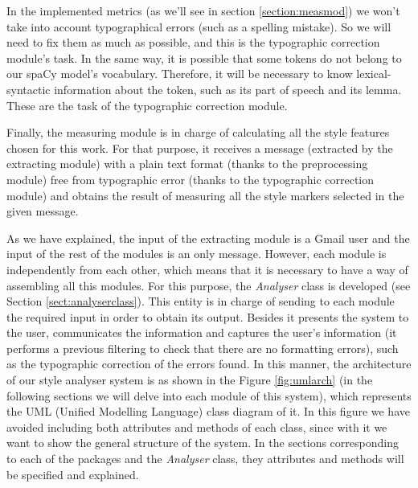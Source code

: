 In the implemented metrics (as we'll see in section \ref{section:measmod}) we won't take into account typographical errors (such as a spelling mistake). So we will need to fix them as much as possible, and this is the typographic correction module's task. In the same way, it is possible that some tokens do not belong to our spaCy model's vocabulary. Therefore, it will be necessary to know lexical-syntactic information about the token, such as its part of speech and its lemma. These are the task of the typographic correction module.

Finally, the measuring module is in charge of calculating all the style features chosen for this work. For that purpose, it receives a message (extracted by the extracting module) with a plain text format (thanks to the preprocessing module) free from typographic error (thanks to the typographic correction module) and obtains the result of measuring all the style markers selected in the given message.

As we have explained, the input of the extracting module is a Gmail user and the input of the rest of the modules is an only message. However, each module is independently from each other, which means that it is necessary to have a way of assembling all this modules. For this purpose, the \textit{Analyser} class is developed (see Section \ref{sect:analyserclass}). This entity is in charge of sending to each module the required input in order to obtain its output. Besides it presents the system to the user, communicates the information and captures the user's information (it performs a previous filtering to check that there are no formatting errors), such as the typographic correction of the errors found. In this manner, the architecture of our style analyser system is as shown in the Figure \ref{fig:umlarch} (in the following sections we will delve into each module of this system), which represents the UML (Unified Modelling Language) class diagram of it. In this figure we have avoided including both attributes and methods of each class, since with it we want to show the general structure of the system. In the sections corresponding to each of the packages and the \textit{Analyser} class, they attributes and methods will be specified and explained.

